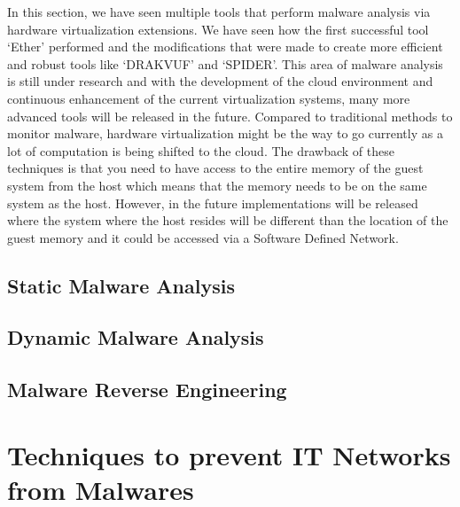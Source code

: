 \documentclass[11pt]{article}
\begin{document}
	In this section, we have seen multiple tools that perform malware analysis via hardware virtualization extensions. We have seen how the first successful tool ‘Ether’ performed and the modifications that were made to create more efficient and robust tools like ‘DRAKVUF’ and ‘SPIDER’. This area of malware analysis is still under research and with the development of the cloud environment and continuous enhancement of the current virtualization systems, many more advanced tools will be released in the future. Compared to traditional methods to monitor malware, hardware virtualization might be the way to go currently as a lot of computation is being shifted to the cloud. The drawback of these techniques is that you need to have access to the entire memory of the guest system from the host which means that the memory needs to be on the same system as the host. However, in the future implementations will be released where the system where the host resides will be different than the location of the guest memory and it could be accessed via a Software Defined Network.
	
	\subsection{Static Malware Analysis}
	\subsection{Dynamic Malware Analysis}
	\subsection{Malware Reverse Engineering}
	
	\section{Techniques to prevent IT Networks from Malwares}
\end{document}
